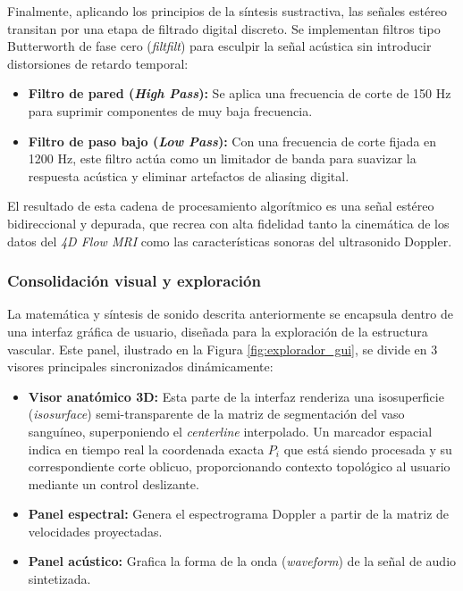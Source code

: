 Finalmente, aplicando los principios de la síntesis sustractiva, las señales estéreo transitan por una etapa de filtrado digital discreto. Se implementan filtros tipo Butterworth de fase cero (\textit{filtfilt}) \cite{Gustafsson1996} para esculpir la señal acústica sin introducir distorsiones de retardo temporal:

\begin{itemize}
    \item \textbf{Filtro de pared (\textit{High Pass}):} Se aplica una frecuencia de corte de 150 Hz para suprimir componentes de muy baja frecuencia.     

    \item \textbf{Filtro de paso bajo (\textit{Low Pass}):} Con una frecuencia de corte fijada en 1200 Hz, este filtro actúa como un limitador de banda para suavizar la respuesta acústica y eliminar artefactos de aliasing digital. 
\end{itemize}

El resultado de esta cadena de procesamiento algorítmico es una señal estéreo bidireccional y depurada, que recrea con alta fidelidad tanto la cinemática de los datos del \textit{4D Flow MRI} como las características sonoras del ultrasonido Doppler.

\subsubsection{Consolidación visual y exploración}

La matemática y síntesis de sonido descrita anteriormente se encapsula dentro de una interfaz gráfica de usuario, diseñada para la exploración de la estructura vascular. Este panel, ilustrado en la Figura \ref{fig:explorador_gui}, se divide en 3 visores principales sincronizados dinámicamente:

\begin{itemize}
    \item \textbf{Visor anatómico 3D:} Esta parte de la interfaz renderiza una isosuperficie (\textit{isosurface}) semi-transparente de la matriz de segmentación del vaso sanguíneo, superponiendo el \textit{centerline} interpolado. Un marcador espacial indica en tiempo real la coordenada exacta $P_i$ que está siendo procesada y su correspondiente corte oblicuo, proporcionando contexto topológico al usuario mediante un control deslizante.

    \item \textbf{Panel espectral:} Genera el espectrograma Doppler a partir de la matriz de velocidades proyectadas.
    
    \item \textbf{Panel acústico:} Grafica la forma de la onda (\textit{waveform}) de la señal de audio sintetizada.
\end{itemize}

